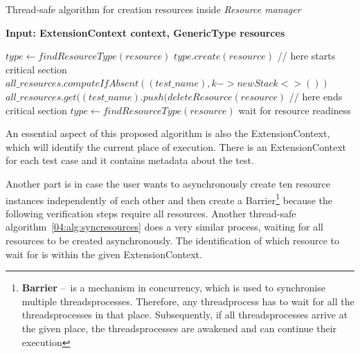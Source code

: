 \begin{algorithm}[H]
    \caption{Thread-safe algorithm for creation resources inside \emph{Resource manager}}
    \label{04:alg:creationofresource}
    \hspace*{\algorithmicindent} \textbf{Input: ExtensionContext context, GenericType resources}

    \begin{algorithmic}[1]
        \State $type \gets findResourceType(resource)$
        \State $type.create(resource)$
        \State // here starts critical section
        \State $all\_resources.computeIfAbsent((test\_name), k -> new Stack<>())$
        \State $all\_resources.get((test\_name).push(deleteResource(resource)$
        \State // here ends critical section
            \State $type \gets findResourceType(resource)$
            \State wait for resource readiness
            \EndForEach
        \EndIf
        \EndForEach
    \end{algorithmic}
\end{algorithm}

An essential aspect of this proposed algorithm is also the ExtensionContext, which will identify the current place of execution.
There is an ExtensionContext for each test case and it contains metadata about the test.

Another part is in case the user wants to asynchronously create ten resource instances independently of each other and then create a Barrier\footnote {\textbf{Barrier} \---\ is a mechanism in concurrency, which is used to synchronise multiple threads\/processes. Therefore, any thread\/process has to wait for all the threads\/processes in that place. Subsequently, if all threads\/processes arrive at the given place, the threads\/processes are awakened and can continue their execution} because the following verification steps require all resources.
Another thread-safe algorithm~\ref{04:alg:syncresources} does a very similar process, waiting for all resources to be created asynchronously.
The identification of which resource to wait for is within the given ExtensionContext.

